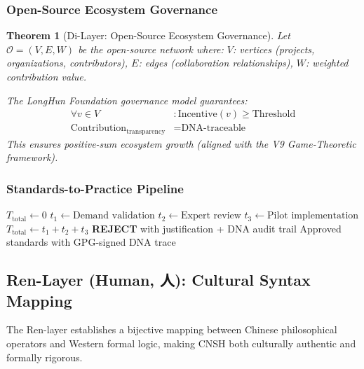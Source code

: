 \documentclass[conference]{IEEEtran}
\newtheorem{theorem}{Theorem}
\begin{document}
\subsubsection{Open-Source Ecosystem Governance}

\begin{theorem}[Di-Layer: Open-Source Ecosystem Governance]
Let $\mathcal{O} = (V, E, W)$ be the open-source network where:
  $V$: vertices (projects, organizations, contributors),
  $E$: edges (collaboration relationships),
  $W$: weighted contribution value.

The LongHun Foundation governance model guarantees:
\begin{align}
  \forall v \in V&: \text{Incentive}(v) \geq \text{Threshold} \\
  \text{Contribution}_{\text{transparency}} &= \text{DNA-traceable}
\end{align}
This ensures positive-sum ecosystem growth (aligned with
the V9 Game-Theoretic framework).
\end{theorem}

\subsubsection{Standards-to-Practice Pipeline}

\begin{algorithm}
\caption{Di-Layer: Standards-to-Practice Pipeline}
\begin{algorithmic}
\State $T_{\text{total}} \gets 0$
  \State $t_1 \gets \text{Demand validation}$ 
  \State $t_2 \gets \text{Expert review}$ 
  \State $t_3 \gets \text{Pilot implementation}$ 
  \State $T_{\text{total}} \gets t_1 + t_2 + t_3$
    \State \textbf{REJECT} with justification + DNA audit trail
  \EndIf
\EndWhile
\State \Return Approved standards with GPG-signed DNA trace
\end{algorithmic}
\end{algorithm}

\subsection{Ren-Layer (Human, 人): Cultural Syntax Mapping}

The Ren-layer establishes a bijective mapping between Chinese
philosophical operators and Western formal logic,
making CNSH both culturally authentic and formally rigorous.
\end{document}
